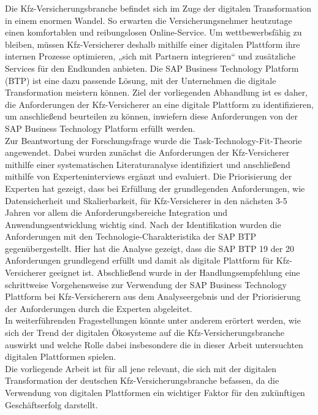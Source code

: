Die Kfz-Versicherungsbranche befindet sich im Zuge der digitalen Transformation in einem enormen Wandel. So erwarten die Versicherungsnehmer heutzutage einen komfortablen und reibungslosen Online-Service. Um wettbewerbsfähig zu bleiben, müssen Kfz-Versicherer deshalb mithilfe einer digitalen Plattform ihre internen Prozesse optimieren, „sich mit Partnern integrieren“ und zusätzliche Services für den Endkunden anbieten. Die SAP Business Technology Platform (BTP) ist eine dazu passende Lösung, mit der Unternehmen die digitale Transformation meistern können. Ziel der vorliegenden Abhandlung ist es daher, die Anforderungen der Kfz-Versicherer an eine digitale Plattform zu identifizieren, um anschließend beurteilen zu können, inwiefern diese Anforderungen von der SAP Business Technology Platform erfüllt werden.\\
Zur Beantwortung der Forschungsfrage wurde die Task-Technology-Fit-Theorie angewendet. Dabei wurden zunächst die Anforderungen der Kfz-Versicherer mithilfe einer systematischen Literaturanalyse identifiziert und anschließend mithilfe von Experteninterviews ergänzt und evaluiert. Die Priorisierung der Experten hat gezeigt, dass bei Erfüllung der grundlegenden Anforderungen, wie Datensicherheit und Skalierbarkeit, für Kfz-Versicherer in den nächsten 3-5 Jahren vor allem die Anforderungsbereiche Integration und Anwendungsentwicklung wichtig sind. Nach der Identifikation wurden die Anforderungen mit den Technologie-Charakteristika der SAP BTP gegenübergestellt. Hier hat die Analyse gezeigt, dass die SAP BTP 19 der 20 Anforderungen grundlegend erfüllt und damit als digitale Plattform für Kfz-Versicherer geeignet ist. Abschließend wurde in der Handlungsempfehlung eine schrittweise Vorgehensweise zur Verwendung der SAP Business Technology Plattform bei Kfz-Versicherern aus dem Analyseergebnis und der Priorisierung der Anforderungen durch die Experten abgeleitet.\\
In weiterführenden Fragestellungen könnte unter anderem erörtert werden, wie sich der Trend der digitalen Ökosysteme auf die Kfz-Versicherungsbranche auswirkt und welche Rolle dabei insbesondere die in dieser Arbeit untersuchten digitalen Plattformen spielen.\\
Die vorliegende Arbeit ist für all jene relevant, die sich mit der digitalen Transformation der deutschen Kfz-Versicherungsbranche befassen, da die Verwendung von digitalen Plattformen ein wichtiger Faktor für den zukünftigen Geschäftserfolg darstellt.







